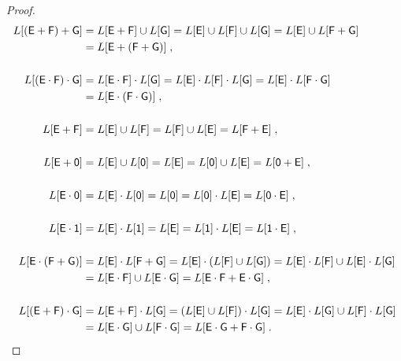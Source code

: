 \begin{proof}
    \begin{align*}
        L[({\mathsf{E}} + {\mathsf{F}}) + {\mathsf{G}}] &= L[{\mathsf{E}} + {\mathsf{F}}] \cup L[{\mathsf{G}}] = L[{\mathsf{E}}] \cup L[{\mathsf{F}}] \cup L[{\mathsf{G}}] = L[{\mathsf{E}}] \cup L[{\mathsf{F}} + {\mathsf{G}}] \\
        &= L[{\mathsf{E}} + ({\mathsf{F}} + {\mathsf{G}})] \; , \\
        \\
        L[({\mathsf{E}} \cdot {\mathsf{F}}) \cdot {\mathsf{G}}] &= L[{\mathsf{E}} \cdot {\mathsf{F}}] \cdot L[{\mathsf{G}}] = L[{\mathsf{E}}] \cdot L[{\mathsf{F}}] \cdot L[{\mathsf{G}}] = L[{\mathsf{E}}] \cdot L[{\mathsf{F}} \cdot {\mathsf{G}}] \\
        &= L[{\mathsf{E}} \cdot ({\mathsf{F}} \cdot {\mathsf{G}})] \; , \\
        \\
        L[{\mathsf{E}} + {\mathsf{F}}] &= L[{\mathsf{E}}] \cup L[{\mathsf{F}}] = L[{\mathsf{F}}] \cup L[{\mathsf{E}}] = L[{\mathsf{F}} + {\mathsf{E}}] \; , \\
        \\
        L[{\mathsf{E}} + {\mathsf{0}}] &= L[{\mathsf{E}}] \cup L[{\mathsf{0}}] = L[{\mathsf{E}}] = L[{\mathsf{0}}] \cup L[{\mathsf{E}}] = L[{\mathsf{0}} + {\mathsf{E}}] \; , \\
        \\
        L[{\mathsf{E}} \cdot {\mathsf{0}}] &= L[{\mathsf{E}}] \cdot L[{\mathsf{0}}] = L[{\mathsf{0}}] = L[{\mathsf{0}}] \cdot L[{\mathsf{E}}] = L[{\mathsf{0}} \cdot {\mathsf{E}}] \; , \\
        \\
        L[{\mathsf{E}} \cdot {\mathsf{1}}] &= L[{\mathsf{E}}] \cdot L[{\mathsf{1}}] = L[{\mathsf{E}}] = L[{\mathsf{1}}] \cdot L[{\mathsf{E}}] = L[{\mathsf{1}} \cdot {\mathsf{E}}] \; , \\
        \\
        L[{\mathsf{E}} \cdot ({\mathsf{F}} + {\mathsf{G}})] &= L[{\mathsf{E}}] \cdot L[{\mathsf{F}} + {\mathsf{G}}] = L[{\mathsf{E}}] \cdot (L[{\mathsf{F}}] \cup L[{\mathsf{G}}]) = L[{\mathsf{E}}] \cdot L[{\mathsf{F}}] \cup L[{\mathsf{E}}] \cdot L[{\mathsf{G}}] \\
        &= L[{\mathsf{E}} \cdot {\mathsf{F}}] \cup L[{\mathsf{E}} \cdot {\mathsf{G}}] = L[{\mathsf{E}} \cdot {\mathsf{F}} + {\mathsf{E}} \cdot {\mathsf{G}}] \; , \\
        \\
        L[({\mathsf{E}} + {\mathsf{F}}) \cdot {\mathsf{G}}] &= L[{\mathsf{E}} + {\mathsf{F}}] \cdot L[{\mathsf{G}}] = (L[{\mathsf{E}}] \cup L[{\mathsf{F}}]) \cdot L[{\mathsf{G}}] = L[{\mathsf{E}}] \cdot L[{\mathsf{G}}] \cup L[{\mathsf{F}}] \cdot L[{\mathsf{G}}] \\
        &= L[{\mathsf{E}} \cdot {\mathsf{G}}] \cup L[{\mathsf{F}} \cdot {\mathsf{G}}] = L[{\mathsf{E}} \cdot {\mathsf{G}} + {\mathsf{F}} \cdot {\mathsf{G}}] \; .
    \end{align*}
\end{proof}

